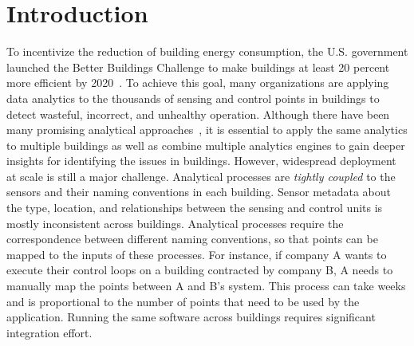 \section{Introduction}

To incentivize the reduction of building energy consumption, the U.S. government 
launched the Better Buildings Challenge to make buildings at least 20 percent 
more efficient by 2020~\cite{doe2013better}. To achieve this goal, many organizations 
are applying data analytics to the thousands of sensing and control points in 
buildings to detect wasteful, incorrect, and unhealthy operation.  
Although there have been many promising analytical approaches~\cite{}, it is essential to apply
the same analytics to multiple buildings as well as combine multiple analytics engines to
gain deeper insights for identifying the issues in buildings.
However, widespread deployment at scale is still a major challenge.
Analytical processes are \emph{tightly coupled} to the sensors and their naming conventions in each building. 
Sensor metadata about the type, location, and relationships between the sensing 
and control units is mostly inconsistent across buildings.
Analytical processes require the correspondence between different naming 
conventions, so that points can be mapped to the inputs of these processes.
For instance, if company A wants to execute their 
control loops on a building contracted by company B, A needs to manually 
map the points between A and B's system. This process can take weeks and is proportional 
to the number of points that need to be used by the application. 
Running the same software across buildings requires significant integration effort.




